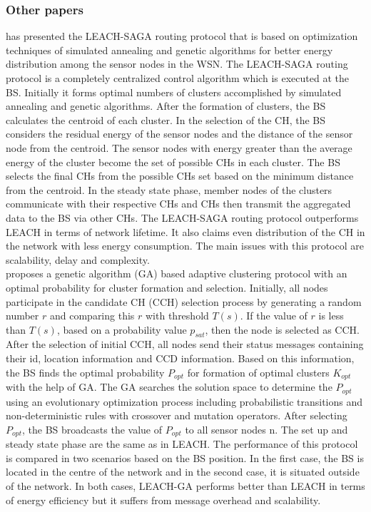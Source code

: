 \documentclass[11pt]{report}
\begin{document}
	\subsubsection{Other papers}
	\cite{article} has presented the LEACH-SAGA routing protocol that is based on optimization techniques of simulated annealing and genetic algorithms for better energy distribution among the sensor nodes in the WSN. The LEACH-SAGA routing protocol is a completely centralized control algorithm which is executed at the BS. Initially it forms optimal numbers of clusters accomplished by simulated annealing and genetic algorithms. After the formation of clusters, the BS calculates the centroid of each cluster. In the selection of the CH, the BS considers the residual energy of the sensor nodes and the distance of the sensor node from the centroid. The sensor nodes with energy greater than the average energy of the cluster become the set of possible CHs in each cluster. The BS selects the final CHs from the possible CHs set based on the minimum distance from the centroid. In the steady state phase, member nodes of the clusters communicate with their respective CHs and CHs then transmit the aggregated data to the BS via other CHs. The LEACH-SAGA routing protocol outperforms LEACH in terms of network lifetime. It also claims even distribution of the CH in the network with less energy consumption. The main issues with this protocol are scalability, delay and complexity.\\
	
	\noindent \cite{Liu2011LEACHGAGA} proposes a genetic algorithm (GA) based adaptive clustering protocol with an optimal probability for cluster formation and selection. Initially, all nodes participate in the candidate CH (CCH) selection process by generating a random number $r$ and comparing this $r$ with threshold $T(s)$. If the value of $r$ is less than $T(s)$, based on a probability value $p_{sat}$, then the node is selected as CCH. After the selection of initial CCH, all nodes send their status messages containing their id, location information and CCD information. Based on this information, the BS finds the optimal probability $P_{opt}$ for formation of optimal clusters $K_{opt}$ with the help of GA. The GA searches the solution space to determine the $P_{opt}$ using an evolutionary optimization process including probabilistic transitions and non-deterministic rules with crossover and mutation operators. After selecting $P_{opt}$, the BS broadcasts the value of $P_{opt}$ to all sensor nodes n. The set up and steady state phase are the same as in LEACH.
	The performance of this protocol is compared in two scenarios based on the BS position. In the first case, the BS is located in the centre of the network and in the second case, it is situated outside of the network. In both cases, LEACH-GA performs better than LEACH in
	terms of energy efficiency but it suffers from message overhead and scalability.
	
\end{document}
